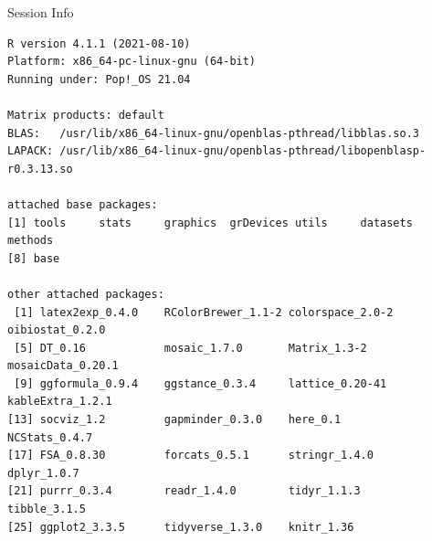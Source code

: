 \documentclass[10pt]{beamer}\usepackage[]{graphicx}\usepackage[]{color}
\makeatletter
\newenvironment{kframe}{%
 \def\at@end@of@kframe{}%
 \ifinner\ifhmode%
  \def\at@end@of@kframe{\end{minipage}}%
  \begin{minipage}{\columnwidth}%
 \fi\fi%
 \def\FrameCommand##1{\hskip\@totalleftmargin \hskip-\fboxsep
 \colorbox{shadecolor}{##1}\hskip-\fboxsep
     \hskip-\linewidth \hskip-\@totalleftmargin \hskip\columnwidth}%
 \MakeFramed {\advance\hsize-\width
   \@totalleftmargin\z@ \linewidth\hsize
   \@setminipage}}%
 {\par\unskip\endMakeFramed%
 \at@end@of@kframe}
\newenvironment{knitrout}{}{} %
\makeatother
\begin{document}
\begin{frame}[fragile]{Session Info}
	\tiny
	
\begin{knitrout}\tiny
{}\color{fgcolor}\begin{kframe}
\begin{verbatim}
R version 4.1.1 (2021-08-10)
Platform: x86_64-pc-linux-gnu (64-bit)
Running under: Pop!_OS 21.04

Matrix products: default
BLAS:   /usr/lib/x86_64-linux-gnu/openblas-pthread/libblas.so.3
LAPACK: /usr/lib/x86_64-linux-gnu/openblas-pthread/libopenblasp-r0.3.13.so

attached base packages:
[1] tools     stats     graphics  grDevices utils     datasets  methods  
[8] base     

other attached packages:
 [1] latex2exp_0.4.0    RColorBrewer_1.1-2 colorspace_2.0-2   oibiostat_0.2.0   
 [5] DT_0.16            mosaic_1.7.0       Matrix_1.3-2       mosaicData_0.20.1 
 [9] ggformula_0.9.4    ggstance_0.3.4     lattice_0.20-41    kableExtra_1.2.1  
[13] socviz_1.2         gapminder_0.3.0    here_0.1           NCStats_0.4.7     
[17] FSA_0.8.30         forcats_0.5.1      stringr_1.4.0      dplyr_1.0.7       
[21] purrr_0.3.4        readr_1.4.0        tidyr_1.1.3        tibble_3.1.5      
[25] ggplot2_3.3.5      tidyverse_1.3.0    knitr_1.36        


\end{verbatim}
\end{kframe}
\end{knitrout}
\end{frame}
\end{document}
